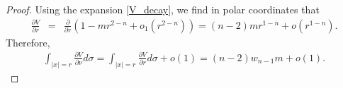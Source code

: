 \documentclass[10pt,a4paper]{amsart}
\begin{document}
\begin{proof}



Using the expansion \eqref{V_decay}, we find in polar coordinates that
\begin{eqnarray*}
    \frac{\partial V}{\partial r} &=& \frac{\partial}{\partial r} \left( 1 - m r^{2-n} + o_{1}(r^{2-n}) \right) = (n-2) m r^{1-n} + o(r^{1-n}). 
\end{eqnarray*}
Therefore,
\begin{eqnarray*}
    \int_{|x| = r } \frac{\partial V}{\partial \nu} d\sigma = \int_{|x|=r} \frac{\partial V}{\partial r} d\sigma + o(1)= (n-2)w_{n-1} m + o(1).
\end{eqnarray*}
\end{proof}
\end{document}
